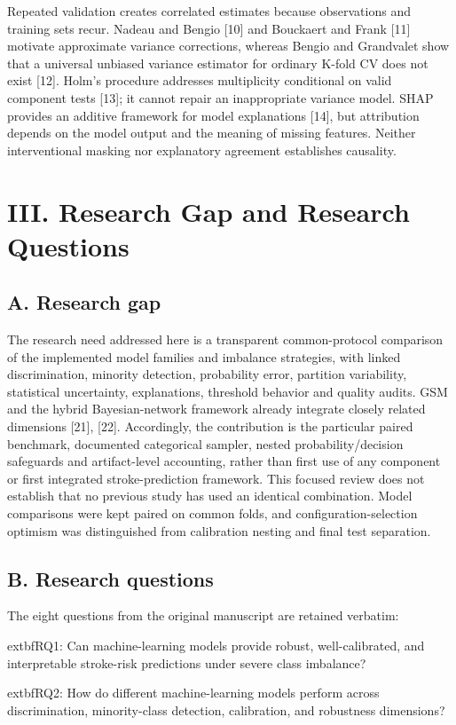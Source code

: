 \documentclass[10pt,twocolumn,letterpaper]{article}
\begin{document}
Repeated validation creates correlated estimates because observations and training sets recur. Nadeau and Bengio [10] and Bouckaert and Frank [11] motivate approximate variance corrections, whereas Bengio and Grandvalet show that a universal unbiased variance estimator for ordinary K-fold CV does not exist [12]. Holm's procedure addresses multiplicity conditional on valid component tests [13]; it cannot repair an inappropriate variance model. SHAP provides an additive framework for model explanations [14], but attribution depends on the model output and the meaning of missing features. Neither interventional masking nor explanatory agreement establishes causality.


\section*{III. Research Gap and Research Questions}
\subsection*{A. Research gap}
The research need addressed here is a transparent common-protocol comparison of the implemented model families and imbalance strategies, with linked discrimination, minority detection, probability error, partition variability, statistical uncertainty, explanations, threshold behavior and quality audits. GSM and the hybrid Bayesian-network framework already integrate closely related dimensions [21], [22]. Accordingly, the contribution is the particular paired benchmark, documented categorical sampler, nested probability/decision safeguards and artifact-level accounting, rather than first use of any component or first integrated stroke-prediction framework. This focused review does not establish that no previous study has used an identical combination. Model comparisons were kept paired on common folds, and configuration-selection optimism was distinguished from calibration nesting and final test separation.


\subsection*{B. Research questions}
The eight questions from the original manuscript are retained verbatim:


	extbf{RQ1:} Can machine-learning models provide robust, well-calibrated, and interpretable stroke-risk predictions under severe class imbalance?


	extbf{RQ2:} How do different machine-learning models perform across discrimination, minority-class detection, calibration, and robustness dimensions?
\end{document}
